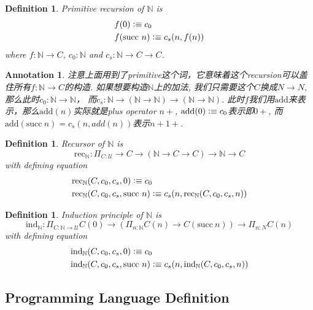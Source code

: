 \documentclass{article}
\newtheorem{definition}[theorem]{Definition}
\newtheorem{annotation}[theorem]{Annotation}
\newcommand{\defeqv}{\vcentcolon\equiv}
\begin{document}
\begin{definition}
\rm Primitive recursion of $\mathbb{N}$ is 
\[
    \begin{aligned}
    &f(0) \defeqv c_0 \\
    &f(\text{succ}~n) \defeqv c_s(n, f(n))
    \end{aligned}
\]
where $f: \mathbb{N} \to C$, $c_0 :\mathbb{N}$ and $c_s : \mathbb{N} \to C \to C$.
\end{definition}

\begin{annotation}
\rm 注意上面用到了primitive这个词，它意味着这个recursion可以盖住所有$f: \mathbb{N} \to C$的构造. 如果想要构造$\mathbb{N}$上的加法, 我们只需要这个$C$换成$N \to N$, 那么此时$c_0 : \mathbb{N} \to \mathbb{N}$， 而$c_s : \mathbb{N} \to (\mathbb{N} \to \mathbb{N}) \to (\mathbb{N} \to \mathbb{N})$. 此时$f$我们用$\text{add}$来表示，那么$\text{add}(n)$实际就是plus operator $n+$, $\text{add(0)} \defeqv c_0$表示即$0+$, 而$\text{add}(\text{succ}~n) = c_s(n, add(n))$表示$n+1+$.
\end{annotation}

\begin{definition}
\rm Recursor of $\mathbb{N}$ is
\[
    \text{rec}_{\mathbb{N}} : \Pi_{C : \mathcal{U}} \to C \to (\mathbb{N} \to C \to C) \to \mathbb{N} \to C
\]
with defining equation
\[
    \begin{aligned}
        &\text{rec}_{\mathbb{N}}(C, c_0, c_s, 0) \defeqv c_0 \\
        &\text{rec}_{\mathbb{N}}(C, c_0, c_s, \text{succ}~n) \defeqv c_s(n,  \text{rec}_{\mathbb{N}}(C, c_0, c_s, n))
    \end{aligned}
\]
\end{definition}

\begin{definition}
\rm Induction principle of $\mathbb{N}$ is 
\[
    \text{ind}_{\mathbb{N}} : \Pi_{C : \mathbb{N} \to \mathcal{U}} C(0) \to (\Pi_{n : \mathbb{N}} C(n) \to C(\text{succ}~n)) \to \Pi_{n: N} C(n)
\]
with defining equation
\[
    \begin{aligned}
        &\text{ind}_{\mathbb{N}}(C, c_0, c_s, 0) \defeqv c_0 \\
        &\text{ind}_{\mathbb{N}}(C, c_0, c_s, \text{succ}~n) \defeqv c_s(n,  \text{ind}_{\mathbb{N}}(C, c_0, c_s, n))
    \end{aligned}
\]
\end{definition}

\subsection{Programming Language Definition}
\end{document}

